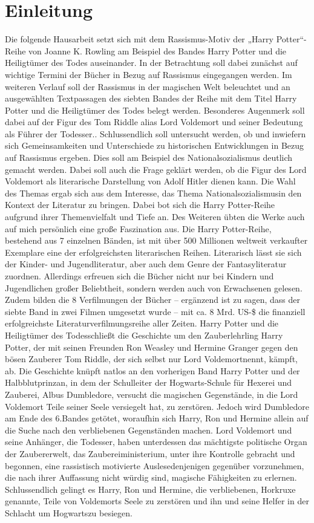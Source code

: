 \section{Einleitung} 
Die folgende Hausarbeit setzt sich mit dem Rassismus-Motiv der „Harry Potter“-Reihe von Joanne K. Rowling am Beispiel des Bandes \glqq Harry Potter und die Heiligtümer des Todes \grqq{} auseinander. In der Betrachtung soll dabei zunächst auf wichtige Termini der Bücher in Bezug auf Rassismus eingegangen werden. Im weiteren Verlauf soll der Rassismus in der magischen Welt beleuchtet und an ausgewählten Textpassagen des siebten Bandes der Reihe mit dem Titel \glqq Harry Potter und die Heiligtümer des Todes\grqq{} belegt werden. Besonderes Augenmerk soll dabei auf der Figur des Tom Riddle alias Lord Voldemort und seiner Bedeutung als Führer der Todesser..
Schlussendlich soll untersucht werden, ob und inwiefern sich Gemeinsamkeiten und Unterschiede zu historischen Entwicklungen in Bezug auf Rassismus ergeben. Dies soll am Beispiel des Nationalsozialismus deutlich gemacht werden. Dabei soll auch die Frage geklärt werden, ob die Figur des Lord Voldemort als  literarische Darstellung von Adolf Hitler dienen kann. Die Wahl des Themas ergab sich aus dem Interesse, das Thema \glqq Nationalsozialismus\grqq in den Kontext der Literatur zu bringen. Dabei bot sich die \glqq Harry Potter\grqq-Reihe aufgrund ihrer Themenvielfalt und Tiefe an. Des Weiteren übten die Werke auch auf mich persönlich eine große Faszination aus. 
Die \glqq Harry Potter\grqq-Reihe, bestehend aus 7 einzelnen Bänden, ist mit über 500 Millionen weltweit verkaufter Exemplare eine der erfolgreichsten literarischen Reihen. Literarisch lässt sie sich der Kinder- und Jugendliteratur, aber auch dem Genre der Fantasyliteratur zuordnen. Allerdings erfreuen sich die Bücher nicht nur bei Kindern und Jugendlichen großer Beliebtheit, sondern werden auch von Erwachsenen gelesen. Zudem bilden die 8 Verfilmungen der Bücher – ergänzend ist zu sagen, dass der siebte Band in zwei Filmen umgesetzt wurde – mit ca. 8 Mrd. US-\$ die finanziell erfolgreichste Literaturverfilmungsreihe aller Zeiten.
\glqq Harry Potter und die Heiligtümer des Todes\grqq schließt die Geschichte um den Zauberlehrling Harry Potter, der mit seinen Freunden Ron Weasley und Hermine Granger gegen den bösen Zauberer Tom Riddle, der sich selbst nur \glqq Lord Voldemort\grqq nennt, kämpft, ab. Die Geschichte knüpft natlos an den vorherigen Band \glqq Harry Potter und der Halbblutprinz\grqq an, in dem der Schulleiter der Hogwarts-Schule für Hexerei und Zauberei, Albus Dumbledore, versucht die magischen Gegenstände, in die Lord Voldemort Teile seiner Seele versiegelt hat, zu zerstören. Jedoch wird Dumbledore am Ende des 6.Bandes getötet, woraufhin sich Harry, Ron und Hermine allein auf die Suche nach den verbliebenen Gegenständen machen. Lord Voldemort und seine Anhänger, die Todesser, haben unterdessen das mächtigste politische Organ der Zaubererwelt, das Zaubereiministerium, unter ihre Kontrolle gebracht und begonnen, eine rassistisch motivierte \glqq Auslese\grqq denjenigen gegenüber vorzunehmen, die nach ihrer Auffassung nicht würdig sind, magische Fähigkeiten zu erlernen. 
Schlussendlich gelingt es Harry, Ron und Hermine, die verbliebenen, Horkruxe genannte, Teile von Voldemorts Seele zu zerstören und ihn und seine Helfer in der \glqq Schlacht um Hogwarts\grqq zu besiegen.
